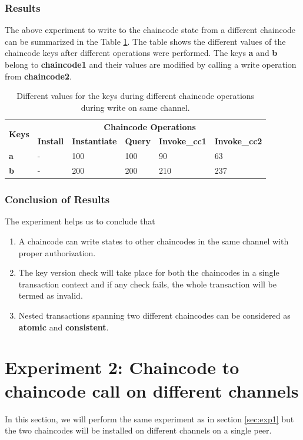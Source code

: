 \documentclass[
  a4paper,  %
  twoside,  %
  bibliography=totoc,
  headsepline,
  cleardoublepage=empty,
  parskip=half,
  draft=false
]{scrbook}
\begin{document}
\subsubsection{Results}
The above experiment to write to the chaincode state from a  different chaincode can be summarized in the Table \ref{tab:result2}. The table shows the different values of the chaincode keys after different operations were performed. The keys \textbf{a} and \textbf{b} belong to \textbf{chaincode1} and their values are modified by calling a write operation from \textbf{chaincode2}.
\begin{table}[h!]
\begin{center}
    \begin{tabular}{ |l|l|l|l|l|l|}
    \hline
    \multirow{2}{*}{\textbf{Keys}} & \multicolumn{5}{c|}{\textbf{Chaincode Operations}}\\ \cline{2-6}
    &\textbf{Install}& \textbf{Instantiate}& \textbf{Query}& \textbf{Invoke\_cc1}& \textbf{Invoke\_cc2} \\ \hline
    \textbf{a} & - & 100 & 100 & 90 & 63 \\ \hline
    \textbf{b} & - & 200 & 200 & 210 & 237 \\ \hline
    \end{tabular}
\end{center}
\caption{Different values for the keys during different chaincode operations during write on same channel.}
\label{tab:result2}
\end{table}
\subsubsection{Conclusion of Results}
The experiment helps us to conclude that \begin{enumerate}
    \item A chaincode can write states to other chaincodes in the same channel with proper authorization.
    \item The key version check will take place for both the chaincodes in a single transaction context and if any check fails, the whole transaction will be termed as invalid. 
    \item Nested transactions spanning two different chaincodes can be considered as \textbf{atomic} and \textbf{consistent}.
\end{enumerate}

\section{Experiment 2: Chaincode to chaincode call on different channels}
In this section, we will perform the same experiment as in section \ref{sec:exp1} but the two chaincodes will be installed on different channels on a single peer.
\end{document}
